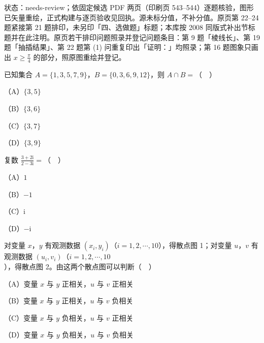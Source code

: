

状态：needs-review；依固定候选 PDF 两页（印刷页 543–544）逐题核验，图形已矢量重绘，正式构建与逐页验收见回执。源未标分值，不补分值。原页第 22–24 题紧接第 21 题排印，未另印「四、选做题」标题；本库按 2008 同版式补出节标题并在此注明。原页若干排印问题照录并登记问题条目：第 9 题「棱线长」、第 19 题「抽插结果」、第 22 题第 (1) 问重复印出「证明：」均照录；第 16 题图象只画出 $x\geqslant\frac{\pi}{4}$ 的部分，照原图重绘并登记。


\begin{question}
已知集合 $A=\{1,3,5,7,9\}$，$B=\{0,3,6,9,12\}$，则 $A\cap B=$（　）

（A）$\{3,5\}$

（B）$\{3,6\}$

（C）$\{3,7\}$

（D）$\{3,9\}$

\end{question}
\begin{question}
复数 $\frac{3+2\mathrm i}{2-3\mathrm i}=$（　）

（A）$1$

（B）$-1$

（C）$\mathrm i$

（D）$-\mathrm i$

\Needspace{0.4\textheight}
\end{question}
\begin{question}
对变量 $x$，$y$ 有观测数据 $(x_i,y_i)$（$i=1,2,\cdots,10$），得散点图 1；对变量 $u$，$v$ 有观测数据 $(u_i,v_i)$（$i=1,2,\cdots,10$），得散点图 2。由这两个散点图可以判断（　）
\nopagebreak[4]
\begin{center}\end{center}
\nopagebreak[4]
（A）变量 $x$ 与 $y$ 正相关，$u$ 与 $v$ 正相关

（B）变量 $x$ 与 $y$ 正相关，$u$ 与 $v$ 负相关

（C）变量 $x$ 与 $y$ 负相关，$u$ 与 $v$ 正相关

（D）变量 $x$ 与 $y$ 负相关，$u$ 与 $v$ 负相关

\end{question}
